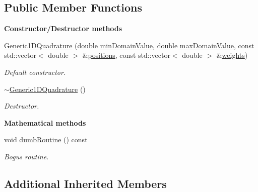 \subsection*{Public Member Functions}
\begin{Indent}{\bf Constructor/\-Destructor methods}\par
\begin{DoxyCompactItemize}
\item 
\hyperlink{class_q_u_e_s_o_1_1_generic1_d_quadrature_a423e55f9b2f5b136cddae91a774f9cb3}{Generic1\-D\-Quadrature} (double \hyperlink{class_q_u_e_s_o_1_1_base1_d_quadrature_a938187458b0069e7b3779bc3739a1cc0}{min\-Domain\-Value}, double \hyperlink{class_q_u_e_s_o_1_1_base1_d_quadrature_af3d09abe6716a23f9061b8b657524547}{max\-Domain\-Value}, const std\-::vector$<$ double $>$ \&\hyperlink{class_q_u_e_s_o_1_1_base1_d_quadrature_a9f5d9b6e20b5105e2c17b7da1b71c259}{positions}, const std\-::vector$<$ double $>$ \&\hyperlink{class_q_u_e_s_o_1_1_base1_d_quadrature_a5780ce2b5ef26ce0f5183e8e32358cee}{weights})
\begin{DoxyCompactList}\small\item\em Default constructor. \end{DoxyCompactList}\item 
\hyperlink{class_q_u_e_s_o_1_1_generic1_d_quadrature_a5b2308f1d8cb6e94f0b5955b7f8ddb69}{$\sim$\-Generic1\-D\-Quadrature} ()
\begin{DoxyCompactList}\small\item\em Destructor. \end{DoxyCompactList}\end{DoxyCompactItemize}
\end{Indent}
\begin{Indent}{\bf Mathematical methods}\par
\begin{DoxyCompactItemize}
\item 
void \hyperlink{class_q_u_e_s_o_1_1_generic1_d_quadrature_a365701bda9fba17fdf5498436722cdde}{dumb\-Routine} () const 
\begin{DoxyCompactList}\small\item\em Bogus routine. \end{DoxyCompactList}\end{DoxyCompactItemize}
\end{Indent}
\subsection*{Additional Inherited Members}


